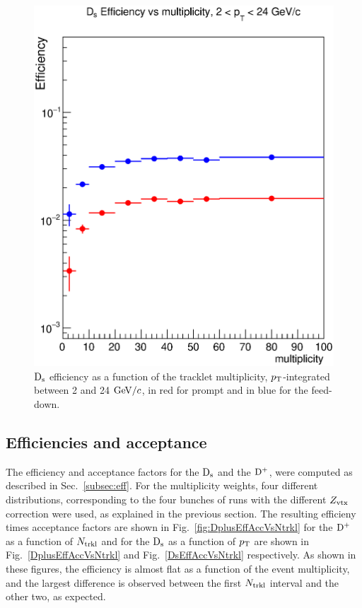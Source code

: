 \begin{figure}[h]
\centering
 \includegraphics[width=.45\textwidth]{FigCap6/DsEffvsMult_pPb2016.eps}
 \caption{${\rm D_s}$ efficiency as a function of the tracklet multiplicity, $p_{\rm T}$-integrated between 2 and 24 $\mathrm{GeV}/c$, in red for prompt and in blue for the feed-down.}
 \label{fig:DsEffVsMult}
\end{figure}

\subsection {Efficiencies and acceptance}
The efficiency and acceptance factors for the ${\rm D_s}$ and the ${\rm D^+}$, were computed as described in Sec.~\ref{subsec:eff}. For the multiplicity weights, four different distributions, corresponding to the four bunches of runs with the different $Z_{\rm vtx}$ correction were used, as explained in the previous section. The resulting efficieny times acceptance factors are shown in Fig.~\ref{fig:DplusEffAccVsNtrkl} for the ${\rm D^+}$ as a function of $N_{\rm trkl}$ and for the ${\rm D_s}$ as a function of $p_{\rm T}$ are shown in Fig.~\ref{DplusEffAccVsNtrkl} and Fig.~\ref{DsEffAccVsNtrkl} respectively. As shown in these figures, the efficiency is almost flat as a function of the event multiplicity, and the largest difference is observed between the first $N_{\rm trkl}$ interval and the other two, as expected.

